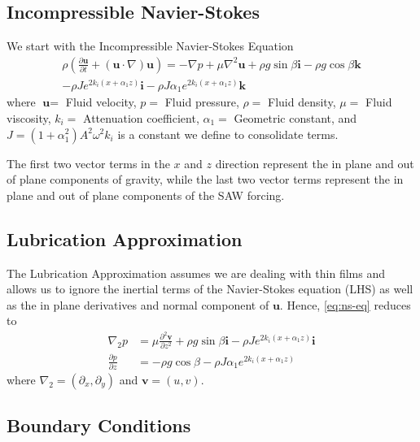 \documentclass[compress, xcolor=dvipsnames]{beamer}
\newcommand{\vect}[1]{\ensuremath{\textbf{#1}}}
\newcommand{\vecu}{\textbf{u}}
\newcommand{\grad}{\ensuremath{\nabla}}
\newcommand{\pderiv}[2]{\ensuremath{\frac{\partial #1}{\partial #2}}}
\newcommand{\lrp}[1]{\left( #1 \right)}
\newcommand{\cexpz}{\ensuremath{e^{2k_i \lrp{x + \alpha_1 z}}}}
\begin{document}
    \subsection{Incompressible Navier-Stokes}
    \begin{frame}
        We start with the Incompressible Navier-Stokes Equation
        \begin{multline}
            \rho \lrp{\pderiv{\vecu}{t} + \lrp{\vecu \cdot \grad}\vecu} = -\grad p
            + \mu \grad^2 \vecu + \rho g \sin \beta \vect{i} - \rho g \cos \beta \vect{k} \\
            - \rho J e^{2k_i \lrp{x + \alpha_1 z}} \vect{i} - \rho J \alpha_1 e^{2k_i \lrp{x + \alpha_1 z}} \vect{k}
            \label{eq:ns-eq}
        \end{multline}
        where $\vect{u} =$ Fluid velocity, $p =$ Fluid pressure, $\rho =$ Fluid density, $\mu =$ Fluid viscosity, 
        $k_i =$  Attenuation coefficient, $\alpha_1 =$ Geometric constant, and $J = \lrp{1 + \alpha_1^2}A^2\omega^2 k_i$
        is a constant we define to consolidate terms. 

        The first two vector terms in the $x$ and $z$ direction represent the in plane and out of plane 
        components of gravity, while the last two vector terms represent the in plane and out of plane 
        components of the SAW forcing. 
    \end{frame}
    \subsection{Lubrication Approximation}
    \begin{frame}
        The Lubrication Approximation assumes we are dealing with thin films
        and allows us to ignore the inertial terms of the Navier-Stokes equation (LHS) as well as the in plane
        derivatives and normal component of $\vecu$. Hence, \cref{eq:ns-eq} reduces to 
        \begin{equation}
            \begin{aligned}
                \grad_2 p &= \mu \frac{\partial^2 \vect{v}}{\partial z^2} + \rho g \sin\beta \vect{i} - \rho J\cexpz\vect{i}\\
                \pderiv{p}{z} &= -\rho g \cos\beta - \rho J\alpha_1 \cexpz
            \end{aligned}
            \label{eq:lub_approx}
        \end{equation}
        where $\grad_2 = \lrp{\partial_x, \partial_y}$ and $\vect{v} = \lrp{u, v}$. 
    \end{frame}
    \subsection{Boundary Conditions}
    \begin{frame}

    \end{frame}

    
\end{document}
